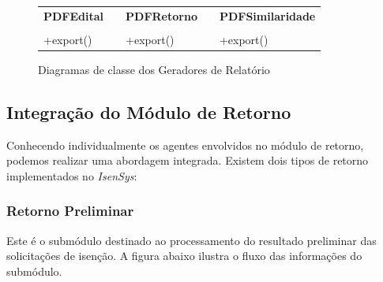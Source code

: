 \documentclass[
	12pt,			%
	openright,		%
	oneside,	
	a4paper,		%
	english,		%
	brazil			%
]{abntex2/abntex2}  %
\begin{document}
	\begin{figure}[H]
		\begin{center}
			
			\caption{Diagramas de classe dos Geradores de Relatório}
			\label{geradores-uml}
			
			\begin{tabular}{|l|l|l|l|l|}
			\cline{1-1} \cline{3-3} \cline{5-5}
			\multicolumn{1}{|c|}{\textbf{PDFEdital}} &  & \multicolumn{1}{c|}{\textbf{PDFRetorno}} &  & \multicolumn{1}{c|}{\textbf{PDFSimilaridade}} \\ \cline{1-1} \cline{3-3} \cline{5-5} 
			&  &                                          &  &                                               \\ \cline{1-1} \cline{3-3} \cline{5-5} 
			+export()                                &  & +export()                                &  & +export()                                     \\ \cline{1-1} \cline{3-3} \cline{5-5} 
			\end{tabular}
			
			
		\end{center}
	\end{figure}
	
	\subsection{Integração do Módulo de Retorno}
	
	Conhecendo individualmente os agentes envolvidos no módulo de retorno, podemos realizar uma abordagem integrada. Existem dois tipos de retorno implementados no \textit{IsenSys}:
	
	\subsubsection{Retorno Preliminar}
	
	Este é o submódulo destinado ao processamento do resultado preliminar das solicitações de isenção. A figura abaixo ilustra o fluxo das informações do submódulo.
	
\end{document}
